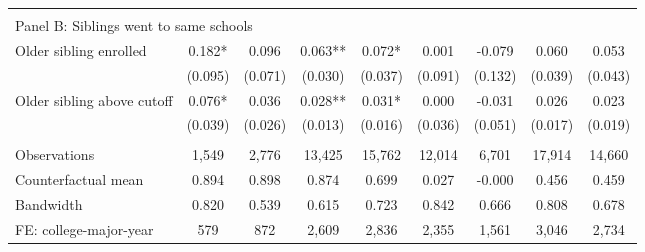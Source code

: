 {{\begin{tabular}{lcccccccc}
&  &  &  & & & & & &    \\
\multicolumn{9}{l}{Panel B: Siblings went to same schools} \\
Older sibling enrolled&       0.182*  &       0.096   &       0.063** &       0.072*  &       0.001   &      -0.079   &       0.060   &       0.053   \\
                    &     (0.095)   &     (0.071)   &     (0.030)   &     (0.037)   &     (0.091)   &     (0.132)   &     (0.039)   &     (0.043)   \\
 
Older sibling above cutoff&       0.076*  &       0.036   &       0.028** &       0.031*  &       0.000   &      -0.031   &       0.026   &       0.023   \\
                    &     (0.039)   &     (0.026)   &     (0.013)   &     (0.016)   &     (0.036)   &     (0.051)   &     (0.017)   &     (0.019)   \\
                    &               &               &               &               &               &               &               &               \\
Observations        &       1,549   &       2,776   &      13,425   &      15,762   &      12,014   &       6,701   &      17,914   &      14,660   \\
Counterfactual mean &       0.894   &       0.898   &       0.874   &       0.699   &       0.027   &      -0.000   &       0.456   &       0.459   \\
Bandwidth           &       0.820   &       0.539   &       0.615   &       0.723   &       0.842   &       0.666   &       0.808   &       0.678   \\
FE: college-major-year&         579   &         872   &       2,609   &       2,836   &       2,355   &       1,561   &       3,046   &       2,734   \\
 

\bottomrule
\end{tabular}
}
}

